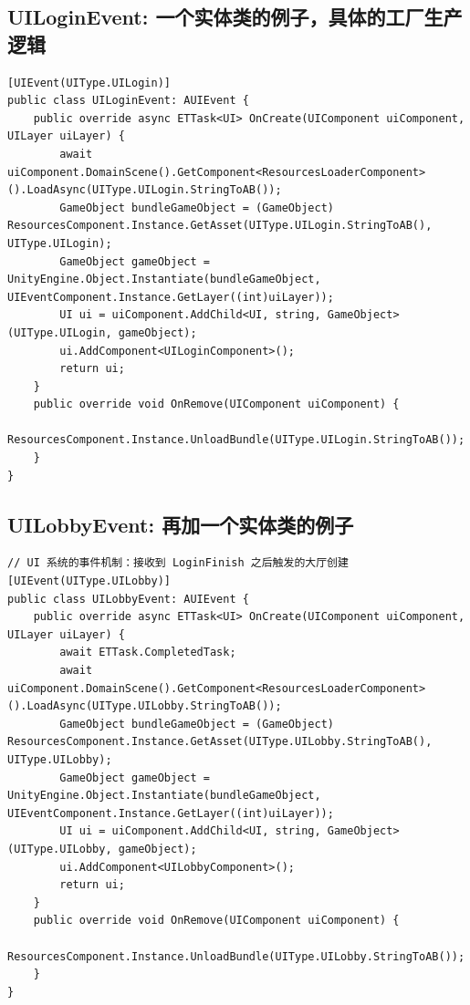 \documentclass[9pt, b5paper]{article}
\begin{document}
\subsection{UILoginEvent: 一个实体类的例子，具体的工厂生产逻辑}
\label{sec-7-10}
\begin{verbatim}
[UIEvent(UIType.UILogin)]
public class UILoginEvent: AUIEvent {
    public override async ETTask<UI> OnCreate(UIComponent uiComponent, UILayer uiLayer) {
        await uiComponent.DomainScene().GetComponent<ResourcesLoaderComponent>().LoadAsync(UIType.UILogin.StringToAB());
        GameObject bundleGameObject = (GameObject) ResourcesComponent.Instance.GetAsset(UIType.UILogin.StringToAB(), UIType.UILogin);
        GameObject gameObject = UnityEngine.Object.Instantiate(bundleGameObject, UIEventComponent.Instance.GetLayer((int)uiLayer));
        UI ui = uiComponent.AddChild<UI, string, GameObject>(UIType.UILogin, gameObject);
        ui.AddComponent<UILoginComponent>();
        return ui;
    }
    public override void OnRemove(UIComponent uiComponent) {
        ResourcesComponent.Instance.UnloadBundle(UIType.UILogin.StringToAB());
    }
}
\end{verbatim}

\subsection{UILobbyEvent: 再加一个实体类的例子}
\label{sec-7-11}
\begin{verbatim}
// UI 系统的事件机制：接收到 LoginFinish 之后触发的大厅创建
[UIEvent(UIType.UILobby)]
public class UILobbyEvent: AUIEvent {
    public override async ETTask<UI> OnCreate(UIComponent uiComponent, UILayer uiLayer) {
        await ETTask.CompletedTask;
        await uiComponent.DomainScene().GetComponent<ResourcesLoaderComponent>().LoadAsync(UIType.UILobby.StringToAB());
        GameObject bundleGameObject = (GameObject) ResourcesComponent.Instance.GetAsset(UIType.UILobby.StringToAB(), UIType.UILobby);
        GameObject gameObject = UnityEngine.Object.Instantiate(bundleGameObject, UIEventComponent.Instance.GetLayer((int)uiLayer));
        UI ui = uiComponent.AddChild<UI, string, GameObject>(UIType.UILobby, gameObject);
        ui.AddComponent<UILobbyComponent>();
        return ui;
    }
    public override void OnRemove(UIComponent uiComponent) {
        ResourcesComponent.Instance.UnloadBundle(UIType.UILobby.StringToAB());
    }
}
\end{verbatim}
\end{document}
